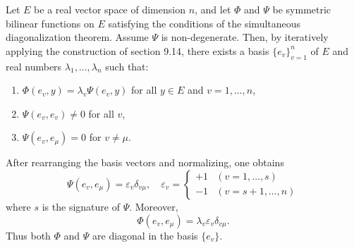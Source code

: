 Let $E$ be a real vector space of dimension $n$, and let $\Phi$ and $\Psi$ be symmetric bilinear functions on $E$ satisfying the conditions of the simultaneous diagonalization theorem. Assume $\Psi$ is non-degenerate. Then, by iteratively applying the construction of section 9.14, there exists a basis $\{e_v\}_{v=1}^n$ of $E$ and real numbers $\lambda_1, \ldots, \lambda_n$ such that:
\begin{enumerate}
\item $\Phi(e_v, y) = \lambda_v \Psi(e_v, y)$ for all $y \in E$ and $v = 1, \ldots, n$,
\item $\Psi(e_v, e_v) \neq 0$ for all $v$,
\item $\Psi(e_v, e_\mu) = 0$ for $v \neq \mu$.
\end{enumerate}
After rearranging the basis vectors and normalizing, one obtains
$$\Psi(e_v, e_\mu) = \varepsilon_v \delta_{v\mu}, \quad \varepsilon_v = \begin{cases} +1 & (v = 1, \ldots, s) \\ -1 & (v = s+1, \ldots, n) \end{cases}$$
where $s$ is the signature of $\Psi$. Moreover,
$$\Phi(e_v, e_\mu) = \lambda_v \varepsilon_v \delta_{v\mu}.$$
Thus both $\Phi$ and $\Psi$ are diagonal in the basis $\{e_v\}$.
